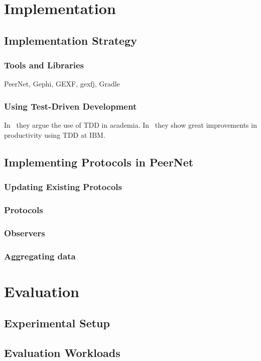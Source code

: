 \documentclass[UKenglish, a4paper]{ifimaster}
\begin{document}
\chapter{Implementation}
\label{ch:implementation}
    \section{Implementation Strategy}
        \subsection{Tools and Libraries}
        PeerNet, Gephi, GEXF, gexfj, Gradle
        \subsection{Using Test-Driven Development}
        In~\cite{janzen2005test} they argue the use of TDD in academia.
        In~\cite{maximilien2003assessing} they show great improvements
        in productivity using TDD at IBM.\
    \section{Implementing Protocols in PeerNet}
        \subsection{Updating Existing Protocols}
        \subsection{Protocols}
        \subsection{Observers}
        \subsection{Aggregating data}

\chapter{Evaluation}
\label{ch:evaluation}
    \section{Experimental Setup}
    \section{Evaluation Workloads}
\end{document}
